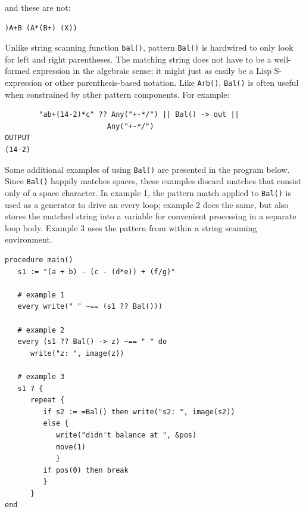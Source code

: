 \documentclass[letterpaper,12pt]{article}
\begin{document}
and these are not:

\begin{verbatim}
)A+B (A*(B+) (X))
\end{verbatim}

Unlike string scanning function {\tt bal()}, pattern {\tt Bal()} is
hardwired to only look for left and right parentheses. The matching
string does not have to be a well-formed expression in the algebraic
sense; it might just as easily be a Lisp S-expression or other
parenthesis-based notation. Like {\tt Arb()}, {\tt Bal()} is often
useful when constrained by other pattern components. For example:

\begin{verbatim}
        "ab+(14-2)*c" ?? Any("+-*/") || Bal() -> out || 
                        Any("+-*/") 
OUTPUT
(14-2)
\end{verbatim}

Some additional examples of using {\tt Bal()} are presented in the
program below.  Since {\tt Bal()} happily matches spaces, these
examples discard matches that consist only of a space character.
In example 1, the pattern match applied to {\tt Bal()} is used
as a generator to drive an every loop; example 2 does the same, but
also stores the matched string into a variable for convenient
processing in a separate loop body.  Example 3 uses the pattern
from within a string scanning environment.


\begin{verbatim}
procedure main()                                                                
   s1 := "(a + b) - (c - (d*e)) + (f/g)"

   # example 1
   every write(" " ~== (s1 ?? Bal()))

   # example 2
   every (s1 ?? Bal() -> z) ~== " " do
      write("z: ", image(z))                                                    

   # example 3
   s1 ? {                                                                       
      repeat {                                                                  
         if s2 := =Bal() then write("s2: ", image(s2))                          
         else {                                                                 
            write("didn't balance at ", &pos)                                   
            move(1)                                                             
            }                                                                   
         if pos(0) then break                                                   
         }                                                                      
      }                                                                         
end
\end{verbatim}
\end{document}
